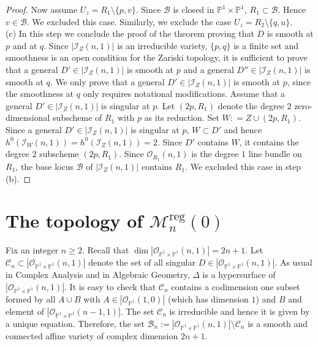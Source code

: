 \documentclass[
  a4paper, 
  reqno, 
  oneside, 
  11pt
]{amsart}
\theoremstyle{plain}	%
\theoremstyle{mydef} %
\theoremstyle{remark}
\theoremstyle{definition}
\theoremstyle{remark}
\DeclareMathOperator{\reg}{reg}
\newcommand{\ce}{\mathrel{\mathop:}=}
\begin{document}
\begin{proof}
Now assume $U_z =R_1\setminus \{p,v\}$. Since $\mathcal B$ is closed in $\mathbb P^1\times \mathbb P^1$,
$R_1\subset \mathcal B$. Hence $v\in \mathcal B$. We excluded this case.
Similarly,  we exclude the case $U_z=R_2\setminus \{q,u\}$.\\


{(c)} In this step we conclude the proof of the theorem proving that $D$ is smooth at $p$ and at $q$. Since $|\mathcal I_Z(n,1)|$ is an irreducible variety, $\{p,q\}$ is a finite set and smoothness is an open condition for the Zariski topology, it is sufficient to prove that  a general $D'\in |\mathcal I_Z(n,1)|$ is smooth at $p$ and a general $D''\in |\mathcal I_Z(n,1)|$ is smooth at $q$. We only prove that  a general $D'\in |\mathcal I_Z(n,1)|$ is smooth at $p$, since the smoothness at $q$ only requires notational modifications. Assume that a general $D'\in |\mathcal I_Z(n,1)|$ is singular at $p$. Let $(2p,R_1)$ denote the degree $2$ zero-dimensional subscheme of $R_1$ with $p$ as its reduction. Set $W\ce Z\cup (2p,R_1)$. Since a general $D'\in |\mathcal I_Z(n,1)|$ is singular at $p$, $W\subset D'$ and hence $h^0(\mathcal I_W(n,1)) =h^0(\mathcal I_Z(n,1)) =2$. Since $D'$ contains $W$, it contains the degree $2$ subscheme $(2p,R_1)$. Since  $\mathcal O_{R_1}(n,1)$ is the degree $1$ line bundle on $R_1$,
the base locus $\mathcal B$ of $|\mathcal I_Z(n,1)|$ contains $R_1$. We excluded this case in step {(b)}.


\end{proof}







\section{The topology of $\mathcal M_n^{\reg}(0)$}


Fix an integer $n\ge 2$. Recall that $\dim |\mathcal O_{\mathbb P^1\times \mathbb P^1}(n,1)|=2n+1$. Let $\mathcal C_n\subset |\mathcal O_{\mathbb P^1\times \mathbb P^1}(n,1)|$ denote the set of all singular $D\in |\mathcal O_{\mathbb P^1\times \mathbb P^1}(n,1)|$. As usual in Complex Analysis and in Algebraic Geometry, $\Delta$ is a hypersurface of $ |\mathcal O_{\mathbb P^1\times \mathbb P^1}(n,1)|$.
 It is easy to check that $\mathcal C_n$ contains a codimension one subset formed by all $A\cup B$ with $A\in |\mathcal O_{\mathbb P^1}(1,0)|$ (which has dimension $1$) and $B$ and element of $|\mathcal O_{\mathbb P^1\times \mathbb P^1}(n-1,1)|$. The set $\mathcal C_n$ is irreducible \cite[Ch.]{GKZ}
 and hence it is given by a unique equation. 
Therefore,  the set $\mathcal B_n:=  |\mathcal O_{\mathbb P^1\times \mathbb P^1}(n,1)|\setminus \mathcal C_n$ is a smooth and connected affine variety of complex dimension $2n+1$. 
\end{document}
